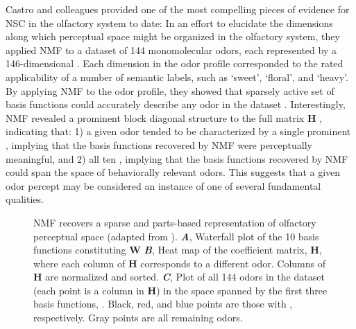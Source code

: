 Castro and colleagues \cite{Castro2013} provided 
one of the most compelling pieces of evidence for \ac{NSC}
in the olfactory system to date:
In an effort to elucidate the dimensions along which perceptual space might be
organized in the olfactory system,
they applied \ac{NMF} to a dataset of 144 monomolecular odors,
each represented by a 146-dimensional .
Each dimension in the odor profile corresponded to the rated applicability of
a number of semantic labels, such as `sweet', `floral', and `heavy'.
By applying \ac{NMF} to the odor profile, they showed that 
 sparsely active set of basis functions 
could accurately describe any odor in the dataset
.
Interestingly, \ac{NMF} revealed a prominent block
diagonal structure to the full matrix \textbf{H}
, indicating that:
1) a given odor tended to be characterized by a single prominent ,
implying that the basis functions recovered by \ac{NMF} were perceptually meaningful,
and 2) all ten ,
implying that the basis functions recovered by \ac{NMF} could span the space of
behaviorally relevant odors.
This suggests that a given odor percept may be considered an 
instance of one of several fundamental qualities.


\begin{figure}[h]
	\centering
    \caption{\ac{NMF} recovers a sparse and parts-based representation
    of olfactory perceptual space (adapted  
    from \cite{Castro2013}).
       \textbf{\emph{A}},
          Waterfall plot of the 10 basis functions constituting \textbf{W}
       \textbf{\emph{B}},
          Heat map of the  coefficient matrix, \textbf{H},
          where each column of \textbf{H} corresponds to a different odor.
          Columns of \textbf{H} are normalized and sorted.
       \textbf{\emph{C}},
          Plot of all 144 odors in the dataset (each point is a column in \textbf{H})
          in the space spanned by the first three basis functions,
          .
          Black, red, and blue points are those with 
          , respectively. 
          Gray points are all remaining odors.}
	\label{fig:evidence-olfaction}
\end{figure}


